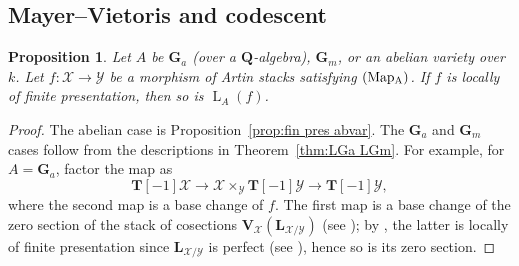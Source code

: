 \documentclass[12pt, oneside]{amsart}
\numberwithin{equation}{section}
\newtheorem{proposition}[subsubsection]{Proposition}
\theoremstyle{remark}
\theoremstyle{plain}
\newcommand{\Loop}{\operatorname{L}}
\newcommand{\YY}{\mathcal{Y}}
\newcommand{\XX}{\mathcal{X}}
\newcommand{\GGa}{\mathbf{G}_{a}}
\newcommand{\GGm}{\mathbf{G}_{m}}
\newcommand{\bQ}{\mathbf{Q}}
\newcommand{\TT}{\mathbf{T}}
\newcommand{\LL}{\mathbf{L}}
\begin{document}
\subsection{Mayer--Vietoris and codescent}

\begin{proposition}\label{prop:fin pres}
  Let $A$ be $\GGa$ (over a $\bQ$-algebra), $\GGm$, or an abelian variety over $k$.
  Let $f:\XX\to\YY$ be a morphism of Artin stacks satisfying $(\textup{Map}\textsubscript{A})$.
  If $f$ is locally of finite presentation, then so is $\Loop_A(f)$.
\end{proposition}
\begin{proof}
  The abelian case is Proposition~\ref{prop:fin pres abvar}.
  The $\GGa$ and $\GGm$ cases follow from the descriptions in Theorem~\ref{thm:LGa LGm}.
  For example, for $A=\GGa$, factor the map as
  \[ \TT[-1]\XX\longrightarrow\XX\times_{\YY}\TT[-1]\YY\longrightarrow\TT[-1]\YY, \]
  where the second map is a base change of $f$.
  The first map is a base change of the zero section of the stack of cosections $\mathbf{V}_{\XX}(\LL_{\XX/\YY})$ (see \cite[Rem.~B.3]{weilres}); by \cite[Prop.~B.1]{weilres}, the latter is locally of finite presentation since $\LL_{\XX/\YY}$ is perfect (see \cite[Prop.~17.4.2.3(1)]{SAG}), hence so is its zero section.
\end{proof}
\end{document}
